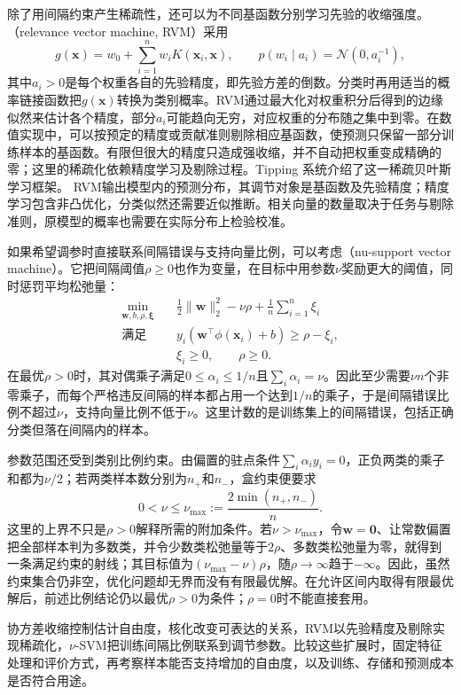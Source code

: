 除了用间隔约束产生稀疏性，还可以为不同基函数分别学习先验的收缩强度。（relevance vector machine, RVM）采用
\[
  g(\bm{x})=w_0+\sum_{i=1}^n w_i K(\bm{x}_i,\bm{x}),
  \qquad
  p(w_i\mid a_i)=\mathcal{N}(0,a_i^{-1}),
\]
其中$a_i>0$是每个权重各自的先验精度，即先验方差的倒数。分类时再用适当的概率链接函数把$g(\bm{x})$转换为类别概率。RVM通过最大化对权重积分后得到的边缘似然来估计各个精度，部分$a_i$可能趋向无穷，对应权重的分布随之集中到零。在数值实现中，可以按预定的精度或贡献准则剔除相应基函数，使预测只保留一部分训练样本的基函数。有限但很大的精度只造成强收缩，并不自动把权重变成精确的零；这里的稀疏化依赖精度学习及剔除过程。Tipping 系统介绍了这一稀疏贝叶斯学习框架。
RVM输出模型内的预测分布，其调节对象是基函数及先验精度；精度学习包含非凸优化，分类似然还需要近似推断。相关向量的数量取决于任务与剔除准则，原模型的概率也需要在实际分布上检验校准。

如果希望调参时直接联系间隔错误与支持向量比例，可以考虑（nu-support vector machine）。它把间隔阈值$\rho\geq0$也作为变量，在目标中用参数$\nu$奖励更大的阈值，同时惩罚平均松弛量：
\begin{equation}
  \begin{aligned}
    \min_{\bm{w},b,\rho,\bm{\xi}}\quad&
      \frac12\lVert\bm{w}\rVert_2^2-\nu\rho
      +\frac1n\sum_{i=1}^n\xi_i\\
    \text{满足}\quad&
      y_i(\bm{w}^{\top}\phi(\bm{x}_i)+b)\geq\rho-\xi_i,\\
    &\xi_i\geq0,\qquad \rho\geq0.
  \end{aligned}
  \label{eq:classification-nu-svm}
\end{equation}
在最优$\rho>0$时，其对偶乘子满足$0\leq\alpha_i\leq1/n$且$\sum_i\alpha_i=\nu$。因此至少需要$\nu n$个非零乘子，而每个严格违反间隔的样本都占用一个达到$1/n$的乘子，于是间隔错误比例不超过$\nu$，支持向量比例不低于$\nu$。这里计数的是训练集上的间隔错误，包括正确分类但落在间隔内的样本。

参数范围还受到类别比例约束。由偏置的驻点条件$\sum_i\alpha_i y_i=0$，正负两类的乘子和都为$\nu/2$；若两类样本数分别为$n_+$和$n_-$，盒约束便要求
\[
  0<\nu\leq\nu_{\max}
  :=\frac{2\min(n_+,n_-)}{n}.
\]
这里的上界不只是$\rho>0$解释所需的附加条件。若$\nu>\nu_{\max}$，令$\bm{w}=\bm{0}$、让常数偏置把全部样本判为多数类，并令少数类松弛量等于$2\rho$、多数类松弛量为零，就得到一条满足约束的射线；其目标值为$(\nu_{\max}-\nu)\rho$，随$\rho\to\infty$趋于$-\infty$。因此，虽然约束集合仍非空，优化问题却无界而没有有限最优解。在允许区间内取得有限最优解后，前述比例结论仍以最优$\rho>0$为条件；$\rho=0$时不能直接套用。

协方差收缩控制估计自由度，核化改变可表达的关系，RVM以先验精度及剔除实现稀疏化，$\nu$-SVM把训练间隔比例联系到调节参数。比较这些扩展时，固定特征处理和评价方式，再考察样本能否支持增加的自由度，以及训练、存储和预测成本是否符合用途。